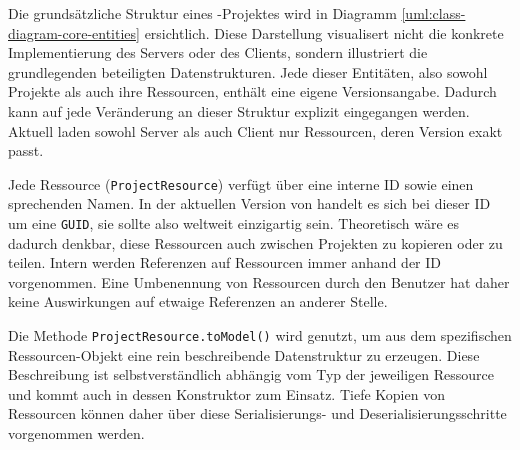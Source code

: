 Die grundsätzliche Struktur eines \idename-Projektes wird in Diagramm \ref{uml:class-diagram-core-entities} ersichtlich. Diese Darstellung visualisert nicht die konkrete Implementierung des Servers oder des Clients, sondern illustriert die grundlegenden beteiligten Datenstrukturen. Jede dieser Entitäten, also sowohl Projekte als auch ihre Ressourcen, enthält eine eigene Versionsangabe. Dadurch kann auf jede Veränderung an dieser Struktur explizit eingegangen werden. Aktuell laden sowohl Server als auch Client nur Ressourcen, deren Version exakt passt.

Jede Ressource (\texttt{ProjectResource}) verfügt über eine interne ID sowie einen sprechenden Namen. In der aktuellen Version von \idename{} handelt es sich bei dieser ID um eine \texttt{GUID}, sie sollte also weltweit einzigartig sein. Theoretisch wäre es dadurch denkbar, diese Ressourcen auch zwischen Projekten zu kopieren oder zu teilen. Intern werden Referenzen auf Ressourcen immer anhand der ID vorgenommen. Eine Umbenennung von Ressourcen durch den Benutzer hat daher keine Auswirkungen auf etwaige Referenzen an anderer Stelle.

Die Methode \texttt{ProjectResource.toModel()} wird genutzt, um aus dem spezifischen Res\-sour\-cen-Objekt eine rein beschreibende Datenstruktur zu erzeugen. Diese Beschreibung ist selbstverständlich abhängig vom Typ der jeweiligen Ressource und kommt auch in dessen Konstruktor zum Einsatz. Tiefe Kopien von Ressourcen können daher über diese Se\-ria\-lisierungs- und Deserialisierungsschritte vorgenommen werden.


